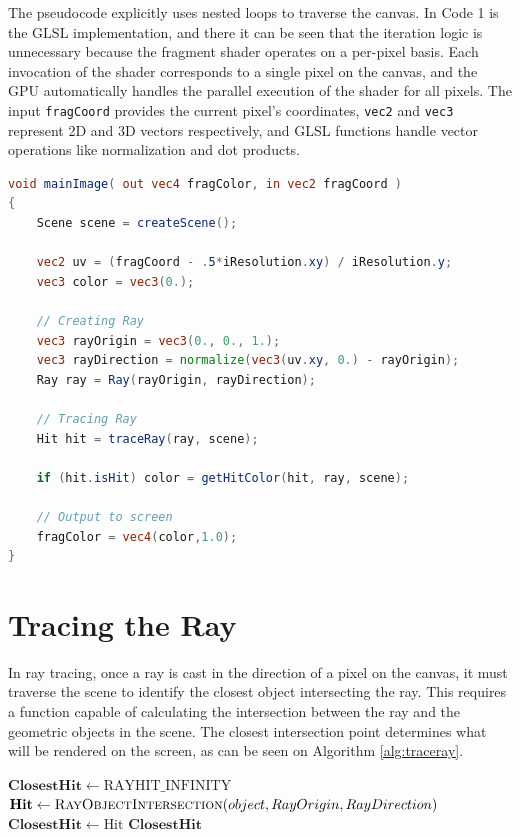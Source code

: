 The pseudocode explicitly uses nested loops to traverse the canvas. In Code 1 is the GLSL implementation, and there it can be seen that the iteration logic is unnecessary because the fragment shader operates on a per-pixel basis. Each invocation of the shader corresponds to a single pixel on the canvas, and the GPU automatically handles the parallel execution of the shader for all pixels. The input \texttt{fragCoord} provides the current pixel's coordinates, \texttt{vec2} and \texttt{vec3} represent 2D and 3D vectors respectively, and GLSL functions handle vector operations like normalization and dot products. 


\begin{lstlisting}[language=GLSL, caption={Code 1: Canvas Traversal}, label={lst:CanvasTraversal} float=ht]
void mainImage( out vec4 fragColor, in vec2 fragCoord )
{
    Scene scene = createScene();

    vec2 uv = (fragCoord - .5*iResolution.xy) / iResolution.y;
    vec3 color = vec3(0.);
    
    // Creating Ray
    vec3 rayOrigin = vec3(0., 0., 1.);
    vec3 rayDirection = normalize(vec3(uv.xy, 0.) - rayOrigin);
    Ray ray = Ray(rayOrigin, rayDirection);
    
    // Tracing Ray
    Hit hit = traceRay(ray, scene);
    
    if (hit.isHit) color = getHitColor(hit, ray, scene);
    
    // Output to screen
    fragColor = vec4(color,1.0);
}
\end{lstlisting}

\section{Tracing the Ray}

In ray tracing, once a ray is cast in the direction of a pixel on the canvas, it must traverse the scene to identify the closest object intersecting the ray. This requires a function capable of calculating the intersection between the ray and the geometric objects in the scene. The closest intersection point determines what will be rendered on the screen, as can be seen on Algorithm \ref{alg:traceray}.


\begin{algorithm}[ht]
\caption{TraceRay}
\label{alg:traceray}
\begin{algorithmic}[1]
    \State $ \mathbf{ClosestHit} \gets \text{RAYHIT\_INFINITY} $
        \State $\mathbf{Hit} \gets \Call{RayObjectIntersection}{object, RayOrigin, RayDirection}$
            \State $\mathbf{ClosestHit} \gets \text{Hit}$
        \EndIf
    \EndFor
    \State \Return $\mathbf{ClosestHit}$
\EndProcedure
\end{algorithmic}
\end{algorithm}


